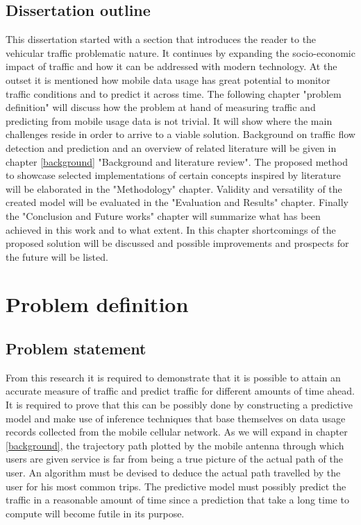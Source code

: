 \documentclass[12pt, a4paper]{report}
\theoremstyle{definition}
\theoremstyle{definition}%
\theoremstyle{definition}%
\theoremstyle{definition}%
\theoremstyle{definition}%
\theoremstyle{definition}%
\begin{document}
\section{Dissertation outline} \label{section:introduction:dissertation_outline}
This dissertation started with a section that introduces the reader to the vehicular traffic problematic nature. It continues by expanding the socio-economic impact of traffic and how it can be addressed with modern technology. At the outset it is mentioned how mobile data usage has great potential to monitor traffic conditions and to predict it across time. The following chapter "problem definition" will discuss how the problem at hand of measuring traffic and predicting from mobile usage data is not trivial. It will show where the main challenges reside in order to arrive to a viable solution. Background on traffic flow detection and prediction and an overview of related literature will be given in chapter \ref{background} "Background and literature review". The proposed method to showcase selected implementations of certain concepts inspired by literature will be elaborated in the "Methodology" chapter.  Validity and versatility of the created model will be evaluated in the "Evaluation and Results" chapter. Finally the "Conclusion and Future works" chapter will summarize what has been achieved in this work and to what extent.  In this chapter shortcomings of the proposed solution will be discussed and possible improvements and prospects for the future will be listed.



\chapter{Problem definition}

\section{Problem statement}
From this research it is required to demonstrate that it is possible to attain an accurate measure of traffic and predict traffic for different amounts of time ahead. It is required to prove that this can be possibly done by constructing a predictive model and make use of inference techniques that base themselves on data usage records collected from the mobile cellular network. As we will expand in chapter \ref{background}, the trajectory path plotted by the mobile antenna through which users are given service is far from being a true picture of the actual path of the user.  An algorithm must be devised to deduce the actual path travelled by the user for his most common trips. The predictive model must possibly predict the traffic in a reasonable amount of time since a prediction that take a long time to compute will become futile in its purpose.
\end{document}
